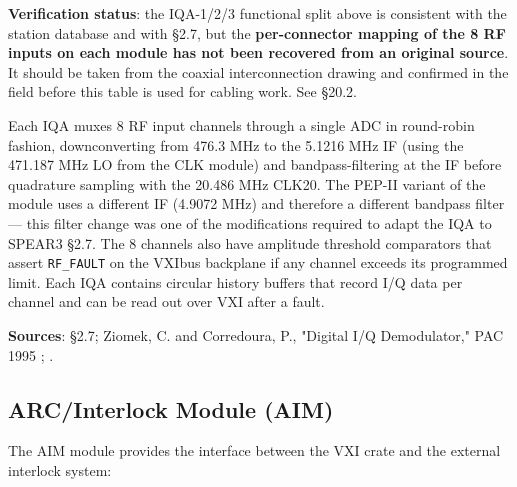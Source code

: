 \begin{keynote}
\textbf{Verification status}: the IQA-1/2/3 functional split above is consistent with the station database and with  §2.7, but the \textbf{per-connector mapping of the 8 RF inputs on each module has not been recovered from an original source}. It should be taken from the coaxial interconnection drawing  and confirmed in the field before this table is used for cabling work. See §20.2.
\end{keynote}

Each IQA muxes 8 RF input channels through a single ADC in round-robin fashion, downconverting from 476.3 MHz to the 5.1216 MHz IF (using the 471.187 MHz LO from the CLK module) and bandpass-filtering at the IF before quadrature sampling with the 20.486 MHz CLK20. The PEP-II variant of the module uses a different IF (4.9072 MHz) and therefore a different bandpass filter --- this filter change was one of the modifications required to adapt the IQA to SPEAR3  §2.7. The 8 channels also have amplitude threshold comparators that assert \texttt{RF\_FAULT} on the VXIbus backplane if any channel exceeds its programmed limit. Each IQA contains circular history buffers that record I/Q data per channel and can be read out over VXI after a fault.

\begin{keynote}
\textbf{Sources}:  §2.7; Ziomek, C. and Corredoura, P., "Digital I/Q Demodulator," PAC 1995 ; .
\end{keynote}

\subsection{ARC/Interlock Module (AIM)}

The AIM module provides the interface between the VXI crate and the external interlock system:

